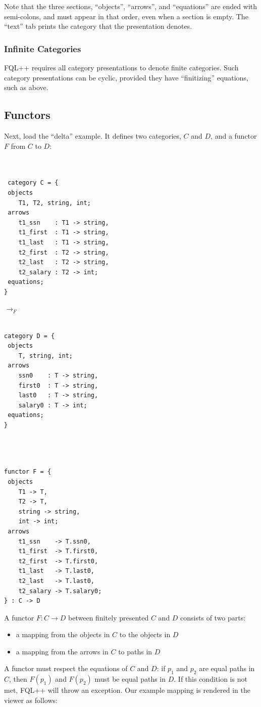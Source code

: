\documentclass[12pt]{article}
\begin{document}
Note that the three sections, ``objects'', ``arrows'', and ``equations'' are ended with semi-colons, and must appear in that order, even when a section is empty.  The ``text'' tab prints the category that the presentation denotes.

\subsubsection{Infinite Categories}

FQL++ requires all category presentations to denote finite categories.  Such category presentations can be cyclic, provided they have ``finitizing'' equations, such as above.  

\subsection{Functors}
Next, load the ``delta'' example.  It defines two categories, $C$ and $D$, and a functor $F$ from $C$ to $D$:

 \begin{minipage}{0.4\textwidth}
\begin{verbatim} 


 category C = {
 objects 
	T1, T2, string, int;
 arrows
	t1_ssn    : T1 -> string,
	t1_first  : T1 -> string,
	t1_last   : T1 -> string,
	t2_first  : T2 -> string,
	t2_last   : T2 -> string,
	t2_salary : T2 -> int;
 equations; 
}    \end{verbatim}
  \end{minipage}
   \hspace{.5in} $\to_F$ \hspace{.5in}
  \begin{minipage}{0.4\textwidth}
\begin{verbatim} 

category D = {
 objects 
	T, string, int;
 arrows
	ssn0    : T -> string,
	first0  : T -> string,
	last0   : T -> string,
	salary0 : T -> int;
 equations;
}   
\end{verbatim} \end{minipage}
  
\begin{verbatim}



functor F = {
 objects 
	T1 -> T,
	T2 -> T,
	string -> string,
	int -> int;
 arrows
	t1_ssn    -> T.ssn0,
	t1_first  -> T.first0,
	t2_first  -> T.first0,
	t1_last   -> T.last0,
	t2_last   -> T.last0,
	t2_salary -> T.salary0;
} : C -> D
\end{verbatim}
A functor $F : C \to D$ between finitely presented $C$ and $D$ consists of two parts:
\begin{itemize}
\item a mapping from the objects in $C$ to the objects in $D$
\item a mapping from the arrows in $C$ to paths in $D$
\end{itemize}
A functor must respect the equations of $C$ and $D$: if $p_1$ and $p_2$ are equal paths in $C$, then $F(p_1)$ and $F(p_2)$ must be equal paths in $D$.  If this condition is not met, FQL++ will throw an exception.  Our example mapping is rendered in the viewer as follows:
\end{document}
